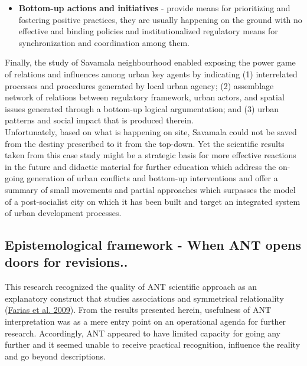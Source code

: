 \documentclass[11pt]{report}
\begin{document}
{\begin{itemize}
\item \textbf{Bottom-up actions and initiatives}  - provide means for prioritizing and fostering positive practices, they are usually happening on the ground with no effective  and  binding policies  and institutionalized  regulatory  means  for synchronization  and  coordination  among  them.
\end{itemize}

Finally, the study of Savamala neighbourhood enabled exposing the power game of relations and influences among urban key agents by indicating
(1)	interrelated processes and procedures generated by local urban agency;
(2)	assemblage network of relations between regulatory framework, urban actors,  and spatial issues generated through a bottom-up logical argumentation;
and
(3)	urban  patterns  and  social  impact that is produced therein.  
\\
Unfortunately, based on what is happening on site, Savamala could not be saved from the destiny prescribed to it from the top-down.
Yet the scientific results taken from this case study might be a strategic basis for more effective reactions in the future and didactic material for further education which address the on-going generation of urban conflicts and bottom-up interventions and offer a summary of small movements and partial approaches which surpasses the model of a post-socialist city on which it has been built and target an integrated system of urban development processes.
 
\subsection{Epistemological framework - When ANT opens doors for revisions..}
 
This research recognized the quality of ANT scientific approach as an explanatory construct that studies associations and symmetrical relationality (\href{}{Farias et al. 2009}).
From the results presented herein, usefulness of ANT interpretation was as a mere entry point on an operational agenda for further research.
Accordingly, ANT appeared to have limited capacity for going any further and it seemed unable to receive practical recognition, influence the reality and go beyond descriptions.

}
\end{document}
